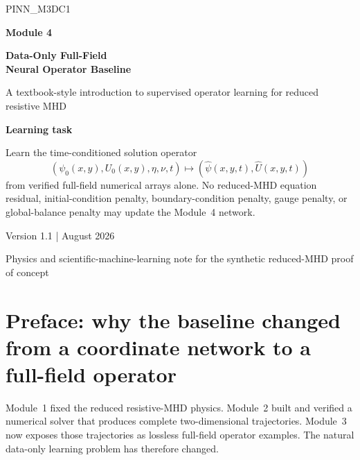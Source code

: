 \documentclass[11pt]{article}
\begin{document}
\hypersetup{pageanchor=false}

\begin{titlepage}
\centering
\vspace*{1.1cm}
{\Large\color{AccentTeal} PINN\_M3DC1}\par
\vspace{0.7cm}
{\Huge\bfseries\color{TitleBlue} Module 4}\par
\vspace{0.25cm}
{\LARGE\bfseries\color{TitleBlue} Data-Only Full-Field\\Neural Operator Baseline}\par
\vspace{0.9cm}
{\large A textbook-style introduction to supervised operator learning for reduced resistive MHD}\par
\vfill
\begin{tcolorbox}[width=0.92\textwidth,colback=SoftBlue,colframe=TitleBlue,arc=2mm]
\centering
\textbf{Learning task}\par
\vspace{0.35em}
Learn the time-conditioned solution operator
\[
\boxed{
\left(\psi_0(x,y),U_0(x,y),\eta,\nu,t\right)
\longmapsto
\left(\widehat\psi(x,y,t),\widehat U(x,y,t)\right)
}
\]
from verified full-field numerical arrays alone. No reduced-MHD equation residual, initial-condition penalty, boundary-condition penalty, gauge penalty, or global-balance penalty may update the Module~4 network.
\end{tcolorbox}
\vfill
{\normalsize Version 1.1 \quad |  August 2026}\par
\vspace{0.25cm}
{\small Physics and scientific-machine-learning note for the synthetic reduced-MHD proof of concept}\par
\end{titlepage}

\hypersetup{pageanchor=true}

\section*{Preface: why the baseline changed from a coordinate network to a full-field operator}

Module~1 fixed the reduced resistive-MHD physics. Module~2 built and verified a numerical solver that produces complete two-dimensional trajectories. Module~3 now exposes those trajectories as lossless full-field operator examples. The natural data-only learning problem has therefore changed.
\end{document}
